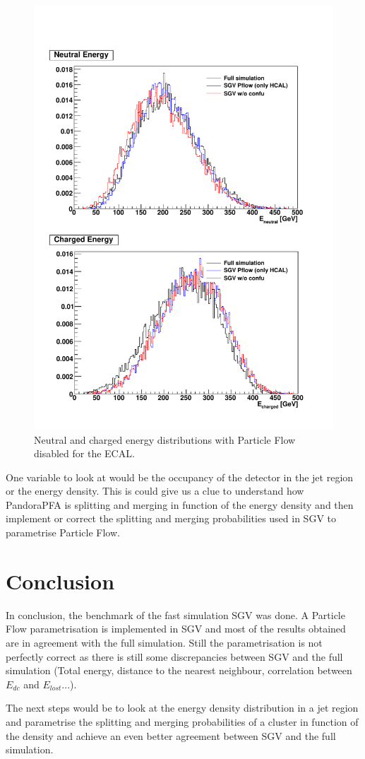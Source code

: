 \begin{figure}[t]
  \centering
  \includegraphics[width=1\linewidth]{chap6/fig_SGV/Total_EneuEcha_notjet_onlyHCAL.pdf}
  \caption{Neutral and charged energy distributions with Particle Flow disabled for the ECAL.}
  \label{fig:energy_ECALnoPFA}
\end{figure}

One variable to look at would be the occupancy of the detector in the jet region or the energy density. This is could give us a clue to understand how PandoraPFA is splitting and merging in function of the energy density and then implement or correct the splitting and merging probabilities used in SGV to parametrise Particle Flow.

\section{Conclusion}

In conclusion, the benchmark of the fast simulation SGV was done. A Particle Flow parametrisation is implemented in SGV and most of the results obtained are in agreement with the full simulation. Still the parametrisation is not perfectly correct as there is still some discrepancies between SGV and the full simulation (Total energy, distance to the nearest neighbour, correlation between $E_{dc}$ and $E_{lost}$...).

The next steps would be to look at the energy density distribution in a jet region and parametrise the splitting and merging probabilities of a cluster in function of the density and achieve an even better agreement between SGV and the full simulation.
